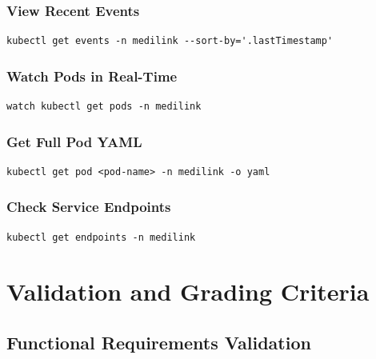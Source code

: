 \documentclass[12pt,a4paper]{article}
\begin{document}
\subsubsection{View Recent Events}
\begin{lstlisting}[style=bash]
kubectl get events -n medilink --sort-by='.lastTimestamp'
\end{lstlisting}

\subsubsection{Watch Pods in Real-Time}
\begin{lstlisting}[style=bash]
watch kubectl get pods -n medilink
\end{lstlisting}

\subsubsection{Get Full Pod YAML}
\begin{lstlisting}[style=bash]
kubectl get pod <pod-name> -n medilink -o yaml
\end{lstlisting}

\subsubsection{Check Service Endpoints}
\begin{lstlisting}[style=bash]
kubectl get endpoints -n medilink
\end{lstlisting}

\section{Validation and Grading Criteria}

\subsection{Functional Requirements Validation}
\end{document}
